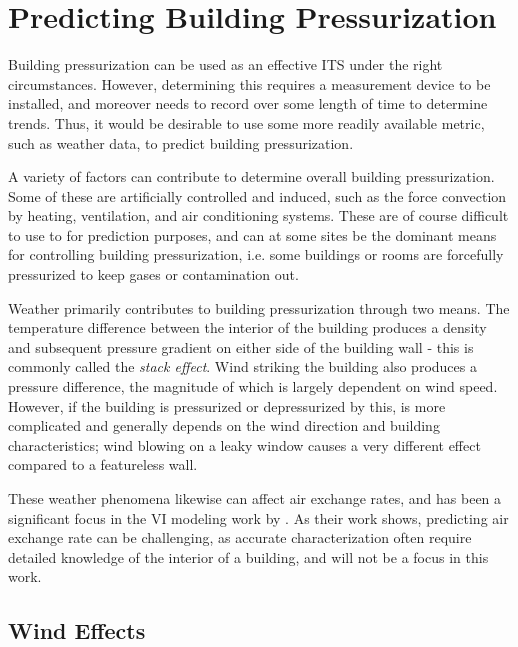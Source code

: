 \section{Predicting Building Pressurization}

Building pressurization can be used as an effective ITS under the right circumstances.
However, determining this requires a measurement device to be installed, and moreover needs to record over some length of time to determine trends.
Thus, it would be desirable to use some more readily available metric, such as weather data, to predict building pressurization.\par

A variety of factors can contribute to determine overall building pressurization.
Some of these are artificially controlled and induced, such as the force convection by heating, ventilation, and air conditioning systems.
These are of course difficult to use to for prediction purposes, and can at some sites be the dominant means for controlling building pressurization, i.e. some buildings or rooms are forcefully pressurized to keep gases or contamination out.\par

Weather primarily contributes to building pressurization through two means.
The temperature difference between the interior of the building produces a density and subsequent pressure gradient on either side of the building wall - this is commonly called the \textit{stack effect}.
Wind striking the building also produces a pressure difference, the magnitude of which is largely dependent on wind speed.
However, if the building is pressurized or depressurized by this, is more complicated and generally depends on the wind direction and building characteristics; wind blowing on a leaky window causes a very different effect compared to a featureless wall.\par

These weather phenomena likewise can affect air exchange rates, and has been a significant focus in the VI modeling work by \citeauthor{shirazi_three-dimensional_2017}\cite{shirazi_three-dimensional_2017}.
As their work shows, predicting air exchange rate can be challenging, as accurate characterization often require detailed knowledge of the interior of a building, and will not be a focus in this work.\par

\subsection{Wind Effects}

